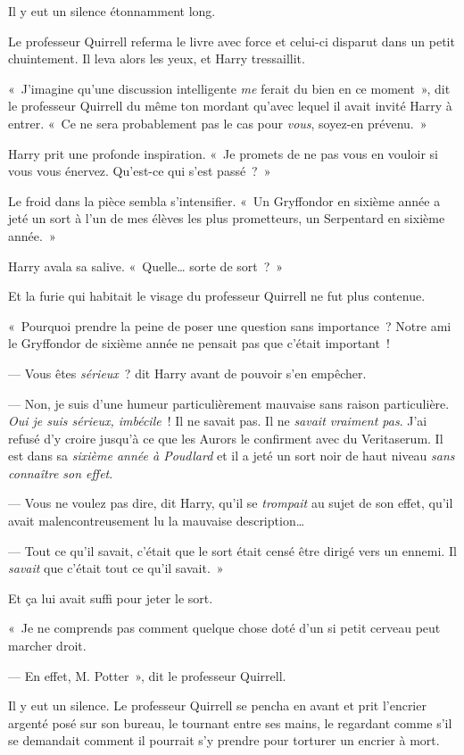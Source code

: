 Il y eut un silence étonnamment long.

Le professeur Quirrell referma le livre avec force et celui-ci disparut dans un petit chuintement. Il leva alors les yeux, et Harry tressaillit.

«~J'imagine qu'une discussion intelligente \emph{me} ferait du bien en ce moment~», dit le professeur Quirrell du même ton mordant qu'avec lequel il avait invité Harry à entrer. «~Ce ne sera probablement pas le cas pour \emph{vous}, soyez-en prévenu.~»

Harry prit une profonde inspiration. «~Je promets de ne pas vous en vouloir si vous vous énervez. Qu'est-ce qui s'est passé~?~»

Le froid dans la pièce sembla s'intensifier. «~Un Gryffondor en sixième année a jeté un sort à l'un de mes élèves les plus prometteurs, un Serpentard en sixième année.~»

Harry avala sa salive. «~Quelle… sorte de sort~?~»

Et la furie qui habitait le visage du professeur Quirrell ne fut plus contenue.

«~Pourquoi prendre la peine de poser une question sans importance~? Notre ami le Gryffondor de sixième année ne pensait pas que c'était important~!

--- Vous êtes \emph{sérieux}~? dit Harry avant de pouvoir s'en empêcher.

--- Non, je suis d'une humeur particulièrement mauvaise sans raison particulière. \emph{Oui je suis sérieux, imbécile}~! Il ne savait pas. Il ne \emph{savait vraiment pas}. J'ai refusé d'y croire jusqu'à ce que les Aurors le confirment avec du Veritaserum. Il est dans sa \emph{sixième année à Poudlard} et il a jeté un sort noir de haut niveau \emph{sans connaître son effet}.

--- Vous ne voulez pas dire, dit Harry, qu'il se \emph{trompait} au sujet de son effet, qu'il avait malencontreusement lu la mauvaise description…

--- Tout ce qu'il savait, c'était que le sort était censé être dirigé vers un ennemi. Il \emph{savait} que c'était tout ce qu'il savait.~»

Et ça lui avait suffi pour jeter le sort.

«~Je ne comprends pas comment quelque chose doté d'un si petit cerveau peut marcher droit.

--- En effet, M. Potter~», dit le professeur Quirrell.

Il y eut un silence. Le professeur Quirrell se pencha en avant et prit l'encrier argenté posé sur son bureau, le tournant entre ses mains, le regardant comme s'il se demandait comment il pourrait s'y prendre pour torturer un encrier à mort.

